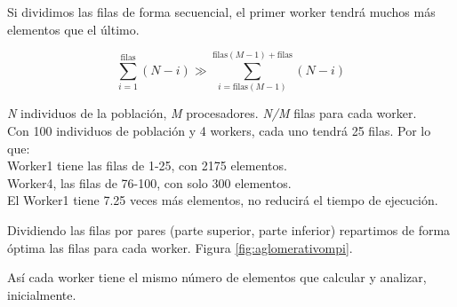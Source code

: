 		\begin{flushleft}
			Si dividimos las filas de forma secuencial, el primer worker tendrá muchos más elementos que el último. 		
		\end{flushleft}
		\begin{flushleft}
			\begin{mdframed}[roundcorner=5pt]
				\[
				\sum_{i=1}^{\text{filas}} (N - i) \gg \sum_{i=\text{filas}(M-1)}^{\text{filas}(M-1) + \text{filas}} (N - i)
				\]
				\begin{tcolorbox}[boxrule=0.5pt, fontupper=\small]
					
					\textit{N} individuos de la población, \textit{M} procesadores. \textit{N/M} filas para cada worker.\\
					
					Con 100 individuos de población y 4 workers, cada uno tendrá 25 filas. Por lo que:\\
					Worker1 tiene las filas de 1-25, con 2175 elementos. \\
					Worker4, las filas de 76-100, con solo 300 elementos. \\
					El Worker1 tiene 7.25 veces más elementos, no reducirá el tiempo de ejecución.
								
				\end{tcolorbox}
				
			\end{mdframed}
		\end{flushleft}
		
		Dividiendo las filas por pares (parte superior, parte inferior) repartimos de forma óptima las filas para cada worker. Figura \ref{fig:aglomerativompi}.
		
		Así cada worker tiene el mismo número de elementos que calcular y analizar, inicialmente. 
		
